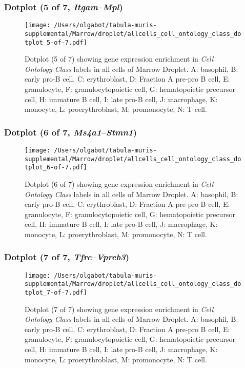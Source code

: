 \clearpage

\subsubsection{Dotplot (5 of 7, \emph{Itgam}--\emph{Mpl})}
\begin{figure}[h]
\centering
\texttt{[image: /Users/olgabot/tabula-muris-supplemental/Marrow/droplet/allcells\_cell\_ontology\_class\_dotplot\_5-of-7.pdf]}

\caption{ Dotplot (5 of 7)  showing gene expression enrichment in \emph{Cell Ontology Class} labels in all cells of Marrow Droplet. A: basophil, B: early pro-B cell, C: erythroblast, D: Fraction A pre-pro B cell, E: granulocyte, F: granulocytopoietic cell, G: hematopoietic precursor cell, H: immature B cell, I: late pro-B cell, J: macrophage, K: monocyte, L: proerythroblast, M: promonocyte, N: T cell.}
\end{figure}


\clearpage

\subsubsection{Dotplot (6 of 7, \emph{Ms4a1}--\emph{Stmn1})}
\begin{figure}[h]
\centering
\texttt{[image: /Users/olgabot/tabula-muris-supplemental/Marrow/droplet/allcells\_cell\_ontology\_class\_dotplot\_6-of-7.pdf]}

\caption{ Dotplot (6 of 7)  showing gene expression enrichment in \emph{Cell Ontology Class} labels in all cells of Marrow Droplet. A: basophil, B: early pro-B cell, C: erythroblast, D: Fraction A pre-pro B cell, E: granulocyte, F: granulocytopoietic cell, G: hematopoietic precursor cell, H: immature B cell, I: late pro-B cell, J: macrophage, K: monocyte, L: proerythroblast, M: promonocyte, N: T cell.}
\end{figure}


\clearpage

\subsubsection{Dotplot (7 of 7, \emph{Tfrc}--\emph{Vpreb3})}
\begin{figure}[h]
\centering
\texttt{[image: /Users/olgabot/tabula-muris-supplemental/Marrow/droplet/allcells\_cell\_ontology\_class\_dotplot\_7-of-7.pdf]}

\caption{ Dotplot (7 of 7)  showing gene expression enrichment in \emph{Cell Ontology Class} labels in all cells of Marrow Droplet. A: basophil, B: early pro-B cell, C: erythroblast, D: Fraction A pre-pro B cell, E: granulocyte, F: granulocytopoietic cell, G: hematopoietic precursor cell, H: immature B cell, I: late pro-B cell, J: macrophage, K: monocyte, L: proerythroblast, M: promonocyte, N: T cell.}
\end{figure}


